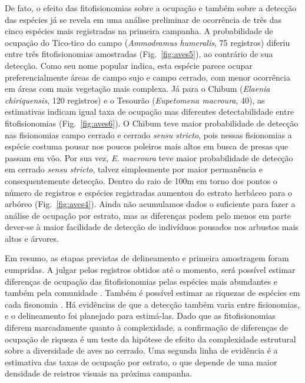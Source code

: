 De fato, o efeito das fitofisionomias sobre a ocupação e também sobre
a detecção das espécies já se revela em uma análise preliminar
de ocorrência de três das cinco espécies mais registradas na
primeira campanha. A probabilidade de ocupação do  Tico-tico 
do campo  (\textit{Ammodramus humeralis}, 75 registros) 
diferiu entre três fitofisionomias amostradas
(Fig.~\ref{fig:aves5}), ao contrário de sua detecção. 
Como seu nome popular indica, esta espécie parece ocupar
preferencialmente áreas de campo sujo e campo cerrado, com menor
ocorrência em áreas com mais vegetação mais complexa. Já para o Chibum
(\textit{Elaenia chiriquensis}, 120 registros) e o Tesourão (\textit{Eupetomena
macroura}, 40), as estimativas indicam igual taxa de ocupação mas diferentes 
detectabilidade entre fitofisionomias 
(Fig.~\ref{fig:aves6}). O Chibum teve maior
probabilidade de detecção nas fisionomias campo cerrado e cerrado
\textit{sensu stricto}, pois nessas fisionomias a espécie costuma pousar nos poucos 
poleiros mais altos em busca de presas que passam em vôo. Por sua vez,
\textit{E. macroura} teve maior probabilidade de detecção em cerrado
\textit{sensu stricto}, talvez simplesmente por
maior permanência e consequentemente detecção.
Dentro do raio de 100m em torno dos pontos o número de registros e 
espécies registradas  aumentou
do estrato herbáceo para o arbóreo (Fig.~\ref{fig:aves4}).  
Ainda não acumulamos 
dados o suficiente para fazer a análise de ocupação
por estrato, mas as diferenças podem pelo menos em parte dever-se 
à maior facilidade de detecção de indivíduos pousados
nos arbustos mais altos e árvores. 

Em resumo, as etapas previstas de delineamento e primeira amostragem
foram cumpridas. A julgar pelos registros obtidos até o momento,
será possível estimar diferenças de ocupação das fitofisionomias
pelas espécies mais abundantes e também pela comunidade \cite{dorazio2005}.
Também é possível estimar as riquezas de espécies
em cada fisonomia \cite{dorazio2006}.
Há evidências de que a detecção também varia entre fisionomias,
e o delineamento foi planejado para estimá-las.
Dado que as fitofisionomias diferem marcadamente quanto à complexidade,
a confirmação de diferenças de ocupação de riqueza é um teste
da hipótese de efeito da complexidade estrutural sobre a diversidade
de aves no cerrado. Uma segunda linha de evidência é a estimativa das
taxas de ocupação por estrato, o que depende de uma maior densidade de 
reistros visuais na próxima campanha.

